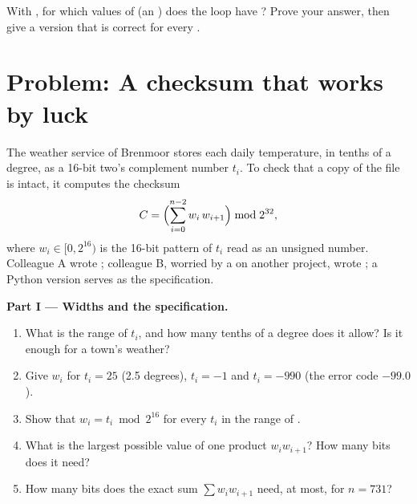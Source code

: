 \begin{exercise}[$\star\star\star$]\label{exo:b1:c-types-and-control:12}
With , for which values of  (an ) does the loop
 have
? Prove your answer, then give a version that is correct for every .
\end{exercise}

\section{Problem: A checksum that works by luck}\label{sec:b1:c-types-and-control:problem}

\begin{problem}\label{pb:b1:c-types-and-control:1}
The weather service of Brenmoor stores each daily temperature, in tenths of a degree, as a 16-bit two's complement
number $t_i$. To check that a copy of the file is intact, it computes the checksum
\[ C = \Bigl(\sum_{i=0}^{n-2} w_i \, w_{i+1}\Bigr) \bmod 2^{32}, \]
where $w_i \in [0, 2^{16})$ is the 16-bit pattern of $t_i$ read as an unsigned number. Colleague A wrote
; colleague B, worried by a  on another project, wrote
; a Python version serves as the specification.
\label{lst:b1:c-types-and-control:naive}
\label{lst:b1:c-types-and-control:fixed}
\label{out:b1:c-types-and-control:problem}

\medskip\noindent\textbf{Part I --- Widths and the specification.}
\begin{enumerate}
\item What is the range of $t_i$, and how many tenths of a degree does it allow? Is it enough for a town's weather?
\item Give $w_i$ for $t_i = 25$ (2.5 degrees), $t_i = -1$ and $t_i = -990$ (the error code $-99.0$).
\item Show that $w_i = t_i \bmod 2^{16}$ for every $t_i$ in the range of .
\item What is the largest possible value of one product $w_i w_{i+1}$? How many bits does it need?
\item How many bits does the exact sum $\sum w_i w_{i+1}$ need, at most, for $n = 731$?
\end{enumerate}


\end{problem}
